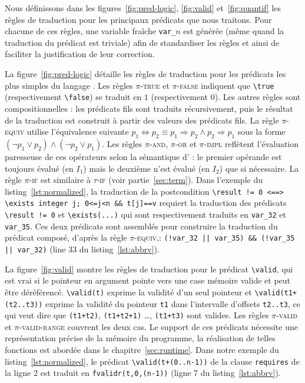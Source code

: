 Nous définissons dans les figures~\ref{fig:pred-logic}, \ref{fig:valid}
et~\ref{fig:quantif} les règles de traduction pour les principaux
prédicats \eacsl que nous traitons.
Pour chacune de ces règles, une variable fraîche \lstinline'var_'$n$ est générée
(même quand la traduction du prédicat est triviale) afin de standardiser les
règles et ainsi de faciliter la justification de leur correction.



La figure~\ref{fig:pred-logic} détaille les règles de traduction pour les
prédicats les plus simples du langage \eacsl.
Les règles \textsc{$\pi$-true} et \textsc{$\pi$-false} indiquent que
\lstinline'\true' (respectivement \lstinline'\false') se traduit en $1$
(respectivement $0$).
Les autres règles sont compositionnelles :
les prédicats fils sont traduits récursivement, puis le résultat de la
traduction est construit à partir des valeurs des prédicats fils.
La règle \textsc{$\pi$-equiv} utilise l'équivalence suivante
$p_1 \Leftrightarrow p_2 \equiv p_1 \Rightarrow p_2 \land p_2 \Rightarrow p_1$
sous la forme $(\lnot p_1 \lor p_2) \land (\lnot p_2 \lor p_1)$.
Les règles \textsc{$\pi$-and}, \textsc{$\pi$-or} et \textsc{$\pi$-impl}
reflètent l'évaluation paresseuse de ces opérateurs selon la sémantique d'\eacsl
: le premier opérande est toujours évalué (en $I_1$) mais le deuxième n'est
évalué (en $I_2$) que si nécessaire.
La règle \textsc{$\pi$-if} est similaire à \textsc{$\tau$-if} (voir
partie~\ref{sec:term}).
Dans l'exemple du listing~\ref{lst:normalized}, la traduction de la
postcondition
\lstinline{\result != 0 <==> \exists integer j; 0<=j<n && t[j]==v} requiert
la traduction des prédicats \lstinline'\result != 0' et
\lstinline{\exists(...)} qui sont respectivement traduits en \lstinline'var_32'
et \lstinline'var_35'.
Ces deux prédicats sont assemblés pour construire la traduction du prédicat
composé, d'après la règle \textsc{$\pi$-equiv},:
\lstinline'(!var_32 || var_35) && (!var_35 || var_32)' (line 33 du
listing~\ref{lst:abbrv}).



La figure~\ref{fig:valid} montre les règles de traduction pour le prédicat
\lstinline'\valid', qui est vrai si le pointeur en argument pointe vers une
case mémoire valide et peut être déréférencé.
\lstinline'\valid(t)' exprime la validité d'un seul pointeur et
\lstinline'\valid(t1+(t2..t3))' exprime la validité du pointeur \lstinline't1'
dans l'intervalle d'offsets \lstinline't2..t3', ce qui veut dire que
\lstinline'(t1+t2)', \lstinline'(t1+t2+1)' \dots, \lstinline'(t1+t3)' sont
valides.
Les règles \textsc{$\pi$-valid} et \textsc{$\pi$-valid-range} couvrent les deux
cas.
Le support de ces prédicats nécessite une représentation précise de la mémoire
du programme, la réalisation de telles fonctions est abordée dans le
chapitre~\ref{sec:runtime}.
Dans notre exemple du listing~\ref{lst:normalized}, le prédicat
\lstinline'\valid(t+(0..n-1))' de la clause \lstinline'requires' de la ligne 2
est traduit en \lstinline[style=c]'fvalidr(t,0,(n-1))' (ligne 7 du
listing~\ref{lst:abbrv}).

